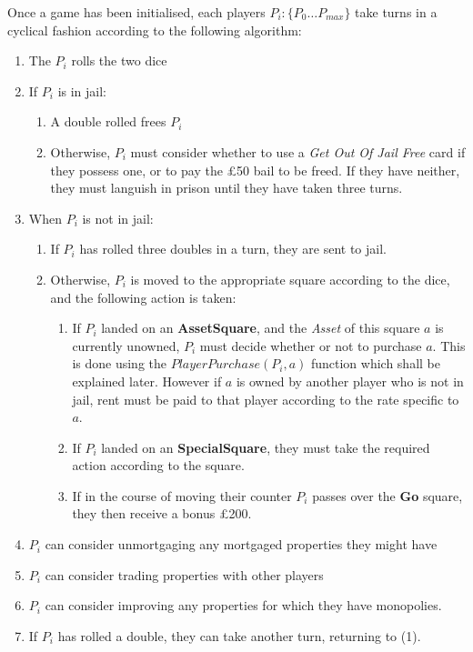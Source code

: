 \documentclass[11pt,a4paper,twocolumn]{scrartcl}
\begin{document}
Once a game has been initialised, each players $P_i : \{P_0 \ldots P_{max}\}$ take turns in a cyclical fashion according to the following algorithm:

\begin{enumerate}
\item The $P_i$ rolls the two dice
\item If $P_i$ is in jail:
\begin{enumerate}
\item A double rolled frees $P_i$
\item Otherwise, $P_i$ must consider whether to use a \textit{Get Out Of Jail Free} card if they possess one, or to pay the \pounds 50 bail to be freed. If they have neither, they must languish in prison until they have taken three turns.
\end{enumerate}
\item When $P_i$ is not in jail:
\begin{enumerate}
\item If $P_i$ has rolled three doubles in a turn, they are sent to jail.
\item Otherwise, $P_i$ is moved to the appropriate square according to the dice, and the following action is taken:
\begin{enumerate}
\item If $P_i$ landed on an \textbf{AssetSquare}, and the \textit{Asset} of this square $a$ is currently unowned, $P_i$ must decide whether or not to purchase $a$. This is done using the $PlayerPurchase(P_i,a)$ function which shall be explained later. However if $a$ is owned by another player who is not in jail, rent must be paid to that player according to the rate specific to $a$.
\item If $P_i$ landed on an \textbf{SpecialSquare}, they must take the required action according to the square.
\item If in the course of moving their counter $P_i$ passes over the \textbf{Go} square, they then receive a bonus \pounds 200.
\end{enumerate}
\end{enumerate}
\item $P_i$ can consider unmortgaging any mortgaged properties they might have
\item $P_i$ can consider trading properties with other players
\item $P_i$ can consider improving any properties for which they have monopolies.
\item If $P_i$ has rolled a double, they can take another turn, returning to (1).
\end{enumerate}
\end{document}
